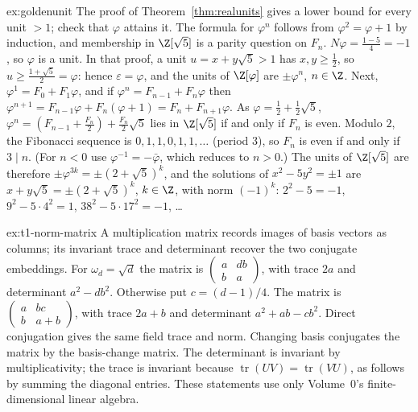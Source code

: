 \begin{solution}{ex:goldenunit}
\idea The proof of Theorem~\ref{thm:realunits} gives a lower bound for every unit $>1$; check that $\varphi$ attains it. The formula for $\varphi^n$ follows from $\varphi^2=\varphi+1$ by induction, and membership in $\Z[\sqrt5]$ is a parity question on $F_n$.
\writeup $N\varphi=\frac{1-5}4=-1$, so $\varphi$ is a unit. In that proof, a unit $u=x+y\sqrt5>1$ has $x,y\ge\frac12$, so $u\ge\frac{1+\sqrt5}2=\varphi$: hence $\varepsilon=\varphi$, and the units of $\Z[\varphi]$ are $\pm\varphi^n$, $n\in\Z$. Next, $\varphi^1=F_0+F_1\varphi$, and if $\varphi^n=F_{n-1}+F_n\varphi$ then $\varphi^{n+1}=F_{n-1}\varphi+F_n(\varphi+1)=F_n+F_{n+1}\varphi$. As $\varphi=\frac12+\frac12\sqrt5$, $\varphi^n=\left(F_{n-1}+\frac{F_n}2\right)+\frac{F_n}2\sqrt5$ lies in $\Z[\sqrt5]$ if and only if $F_n$ is even. Modulo $2$, the Fibonacci sequence is $0,1,1,0,1,1,\dots$ (period $3$), so $F_n$ is even if and only if $3\mid n$. (For $n<0$ use $\varphi^{-1}=-\bar\varphi$, which reduces to $n>0$.) The units of $\Z[\sqrt5]$ are therefore $\pm\varphi^{3k}=\pm(2+\sqrt5)^k$, and the solutions of $x^2-5y^2=\pm1$ are $x+y\sqrt5=\pm(2+\sqrt5)^k$, $k\in\Z$, with norm $(-1)^k$: $2^2-5=-1$, $9^2-5\cdot4^2=1$, $38^2-5\cdot17^2=-1$, \dots
\end{solution}

\begin{solution}{ex:t1-norm-matrix}
\idea A multiplication matrix records images of basis vectors as columns;
its invariant trace and determinant recover the two conjugate embeddings.
\writeup For $\omega_d=\sqrt d$ the matrix is
$\begin{pmatrix}a&db\\ b&a\end{pmatrix}$, with trace $2a$ and determinant
$a^2-db^2$. Otherwise put $c=(d-1)/4$. The matrix is
$\begin{pmatrix}a&bc\\ b&a+b\end{pmatrix}$, with trace $2a+b$ and determinant
$a^2+ab-cb^2$. Direct conjugation gives the same field trace and norm.
Changing basis conjugates the matrix by the basis-change matrix.
The determinant is invariant by multiplicativity; the trace is invariant
because $\operatorname{tr}(UV)=\operatorname{tr}(VU)$, as follows by
summing the diagonal entries. These statements use only Volume~0's
finite-dimensional linear algebra.
\end{solution}


